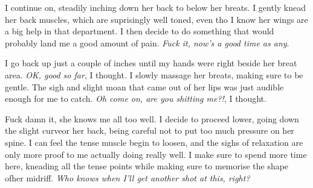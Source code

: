 \documentclass{article}
\begin{document}
I continue on, steadily inching down her back to below her breats. I gently knead her back muscles, which are suprisingly well toned, even tho I know her wings are a big help in that department. I then decide to do something that would probably land me a good amount of pain. \emph{Fuck it, now's a good time as any}.

I go back up just a couple of inches until my hands were right beside her breat area. \emph{OK, good so far}, I thought. I slowly massage her breats, making sure to be gentle. The sigh and slight moan that came out of her lips was just audible enough for me to catch. \emph{Oh come on, are you shitting me?!}, I thought.

Fuck damn it, she knows me all too well. I decide to proceed lower, going down the slight curveor her back, being careful not to put too much pressure on her spine. I can feel the tense muscle begin to loosen, and the sighs of relaxation are only more proof to me actually doing really well. I make sure to spend more time here, kneading all the tense points while making sure to memorise the shape ofher midriff. \emph{Who knows when I'll get another shot at this, right?}
\end{document}
